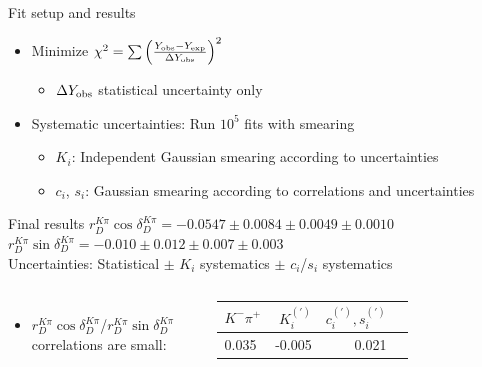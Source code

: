 \documentclass{beamer}
\begin{document}
\begin{frame}{Fit setup and results}
  \begin{itemize}
    \setlength\itemsep{1.0em}
    \item{Minimize $\chi^2 = \sum\Big(\frac{Y_{\rm obs} - Y_{\rm exp}}{\Delta Y_{\rm obs}}\Big)^2$}
    \begin{itemize}
      \item{$\Delta Y_{\rm obs}$ statistical uncertainty only}
    \end{itemize}
    \item{Systematic uncertainties: Run $10^5$ fits with smearing}
    \begin{itemize}
      \item{$K_i$: Independent Gaussian smearing according to uncertainties}
      \item{$c_i$, $s_i$: Gaussian smearing according to correlations and uncertainties}
    \end{itemize}
  \end{itemize}
  \begin{block}{Final results}
    \vspace{0.1cm}
    $r_D^{K\pi}\cos\delta_D^{K\pi} = -0.0547\pm0.0084\pm0.0049\pm0.0010$ \\
    \vspace{0.3cm}
    $r_D^{K\pi}\sin\delta_D^{K\pi} = -0.010\pm0.012\pm0.007\pm0.003$ \\
    \vspace{0.1cm}
    Uncertainties: Statistical $\pm$ $K_i$ systematics $\pm$ $c_i$/$s_i$ systematics
  \end{block}
  \vspace{-0.2cm}
  \begin{columns}
    \begin{itemize}
      \vspace{0.1cm}
      \item{$r_D^{K\pi}\cos\delta_D^{K\pi}$/$r_D^{K\pi}\sin\delta_D^{K\pi}$ correlations are small:}
    \end{itemize}
    \begin{tabular}{lrrr}
      \\
      \hline
      $K^-\pi^+$ & $K_i^{(\prime)}$ & $c_i^{(\prime)}, s_i^{(\prime)}$ \\
      \hline
      0.035      & -0.005           & 0.021 \\
      \hline
    \end{tabular}
  \end{columns}
\end{frame}
\end{document}
